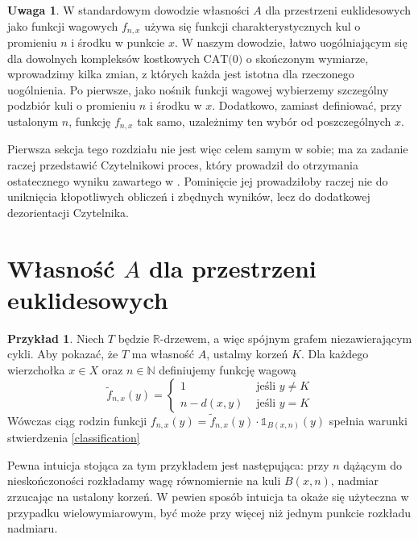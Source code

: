 \documentclass[licencjacka]{pracamgr}
\theoremstyle{definition}
\theoremstyle{definition}
\newtheorem{remark}{Uwaga}[section]
\theoremstyle{definition}
\theoremstyle{definition}
\newtheorem{example}{Przykład}[section]
\theoremstyle{definition}
\theoremstyle{plain}
\theoremstyle{plain}
\begin{document}
\begin{remark}\label{rem:motivation}
	W standardowym dowodzie własności $ A $ dla przestrzeni euklidesowych jako funkcji 
	wagowych $ f_{n,x} $ używa się funkcji charakterystycznych kul o promieniu $ n $ 
	i środku w punkcie $ x $. W naszym dowodzie, łatwo uogólniającym się dla 
	dowolnych kompleksów kostkowych $ \text{CAT(0)} $ o skończonym wymiarze, wprowadzimy 
	kilka zmian, z których każda jest istotna dla rzeczonego uogólnienia. Po pierwsze, jako 
	nośnik funkcji wagowej wybierzemy szczególny podzbiór kuli o promieniu $ n $ i środku 
	w $ x $. Dodatkowo, zamiast definiować, przy ustalonym $ n $, funkcję $ f_{n,x} $ tak samo, 
	uzależnimy ten wybór od poszczególnych $ x $.

	Pierwsza sekcja tego rozdziału nie jest więc celem samym w sobie; ma za zadanie 
	raczej przedstawić Czytelnikowi proces, który prowadził do otrzymania ostatecznego 
	wyniku zawartego w \cite{brodzki}. Pominięcie jej prowadziłoby raczej nie do uniknięcia 
	kłopotliwych obliczeń i zbędnych wyników, lecz do dodatkowej dezorientacji Czytelnika.
\end{remark}

\section{Własność $ A $ dla przestrzeni euklidesowych}

\begin{example}
	Niech $ T $ będzie $ \mathbb{R} $-drzewem, a więc spójnym grafem niezawierającym cykli. 
	Aby pokazać, że $ T $ ma własność $ A $, ustalmy korzeń $ K $. Dla każdego wierzchołka 
	$ x \in X $ oraz $ n \in\mathbb{N} $ definiujemy funkcję wagową
	$$ \tilde f_{n,x}(y) = 
	\begin{cases}
		1 & \text{ jeśli } y \neq K \\
		n - d(x,y) & \text{ jeśli } y = K
	\end{cases} $$
	Wówczas ciąg rodzin funkcji $ f_{n,x}(y) = \tilde f_{n,x}(y) \cdot \mathbb{1}_{B
	(x, n)} (y) $ spełnia warunki stwierdzenia \ref{classification}
\end{example}

Pewna intuicja stojąca za tym przykładem jest następująca: przy $ n $ dążącym do 
nieskończoności rozkładamy wagę równomiernie na kuli $ B(x,n) $, nadmiar zrzucając na 
ustalony korzeń. W pewien sposób intuicja ta okaże się użyteczna w przypadku 
wielowymiarowym, być może przy więcej niż jednym punkcie rozkładu nadmiaru. 
\end{document}
